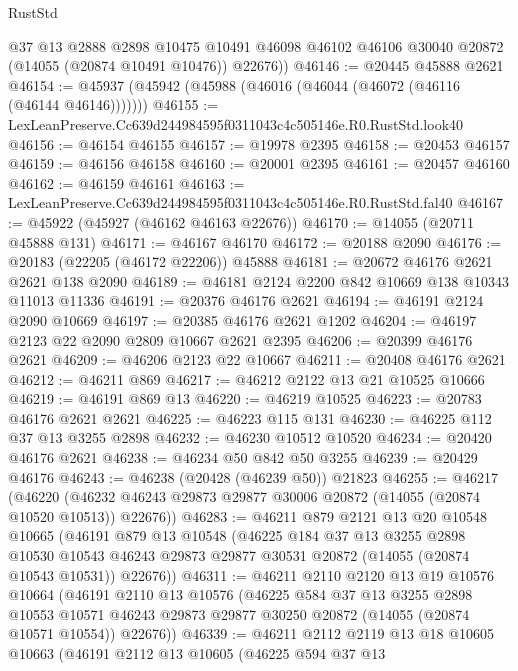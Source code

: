 \begin{lexlean}{RustStd}
\begin{coremodule}
        @37
        @13
        @2888
        @2898
        @10475
        @10491
        @46098
        @46102
        @46106
        @30040
        @20872
        (@14055 (@20874 @10491 @10476))
        @22676))
@46146 := @20445 @45888 @2621
@46154 := @45937 (@45942 (@45988 (@46016 (@46044 (@46072 (@46116 (@46144 @46146)))))))
@46155 := LexLeanPreserve.Cc639d244984595f0311043c4c505146e.R0.RustStd.look40
@46156 := @46154 @46155
@46157 := @19978 @2395
@46158 := @20453 @46157
@46159 := @46156 @46158
@46160 := @20001 @2395
@46161 := @20457 @46160
@46162 := @46159 @46161
@46163 := LexLeanPreserve.Cc639d244984595f0311043c4c505146e.R0.RustStd.fal40
@46167 := @45922 (@45927 (@46162 @46163 @22676))
@46170 := @14055 (@20711 @45888 @131)
@46171 := @46167 @46170
@46172 := @20188 @2090
@46176 := @20183 (@22205 (@46172 @22206)) @45888
@46181 := @20672 @46176 @2621 @2621 @138 @2090
@46189 := @46181 @2124 @2200 @842 @10669 @138 @10343 @11013 @11336
@46191 := @20376 @46176 @2621
@46194 := @46191 @2124 @2090 @10669
@46197 := @20385 @46176 @2621 @1202
@46204 := @46197 @2123 @22 @2090 @2809 @10667 @2621 @2395
@46206 := @20399 @46176 @2621
@46209 := @46206 @2123 @22 @10667
@46211 := @20408 @46176 @2621
@46212 := @46211 @869
@46217 := @46212 @2122 @13 @21 @10525 @10666
@46219 := @46191 @869 @13
@46220 := @46219 @10525
@46223 := @20783 @46176 @2621 @2621
@46225 := @46223 @115 @131
@46230 := @46225 @112 @37 @13 @3255 @2898
@46232 := @46230 @10512 @10520
@46234 := @20420 @46176 @2621
@46238 := @46234 @50 @842 @50 @3255
@46239 := @20429 @46176
@46243 := @46238 (@20428 (@46239 @50)) @21823
@46255 := @46217
    (@46220 (@46232 @46243 @29873 @29877 @30006 @20872 (@14055 (@20874 @10520 @10513)) @22676))
@46283 := @46211
    @879
    @2121
    @13
    @20
    @10548
    @10665
    (@46191
      @879
      @13
      @10548
      (@46225
        @184
        @37
        @13
        @3255
        @2898
        @10530
        @10543
        @46243
        @29873
        @29877
        @30531
        @20872
        (@14055 (@20874 @10543 @10531))
        @22676))
@46311 := @46211
    @2110
    @2120
    @13
    @19
    @10576
    @10664
    (@46191
      @2110
      @13
      @10576
      (@46225
        @584
        @37
        @13
        @3255
        @2898
        @10553
        @10571
        @46243
        @29873
        @29877
        @30250
        @20872
        (@14055 (@20874 @10571 @10554))
        @22676))
@46339 := @46211
    @2112
    @2119
    @13
    @18
    @10605
    @10663
    (@46191
      @2112
      @13
      @10605
      (@46225
        @594
        @37
        @13

\end{coremodule}
\end{lexlean}
